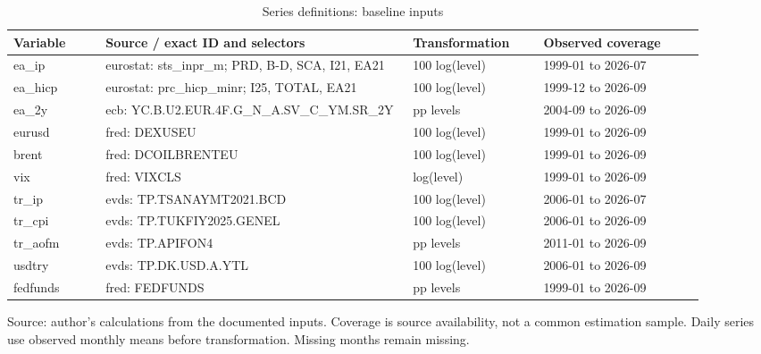 \begin{table}[htbp]
\centering
\footnotesize
\caption{Series definitions: baseline inputs}
\begin{tabularx}{\linewidth}{p{0.12\linewidth}p{0.40\linewidth}p{0.17\linewidth}p{0.21\linewidth}}
\toprule
Variable & Source / exact ID and selectors & Transformation & Observed coverage \\
\midrule
ea\_\allowbreak{}ip & eurostat: sts\_\allowbreak{}inpr\_\allowbreak{}m; PRD, B-D, SCA, I21, EA21 & 100 log(level) & 1999-01 to 2026-07 \\
ea\_\allowbreak{}hicp & eurostat: prc\_\allowbreak{}hicp\_\allowbreak{}minr; I25, TOTAL, EA21 & 100 log(level) & 1999-12 to 2026-09 \\
ea\_\allowbreak{}2y & ecb: YC.\allowbreak{}B.\allowbreak{}U2.\allowbreak{}EUR.\allowbreak{}4F.\allowbreak{}G\_\allowbreak{}N\_\allowbreak{}A.\allowbreak{}SV\_\allowbreak{}C\_\allowbreak{}YM.\allowbreak{}SR\_\allowbreak{}2Y & pp levels & 2004-09 to 2026-09 \\
eurusd & fred: DEXUSEU & 100 log(level) & 1999-01 to 2026-09 \\
brent & fred: DCOILBRENTEU & 100 log(level) & 1999-01 to 2026-09 \\
vix & fred: VIXCLS & log(level) & 1999-01 to 2026-09 \\
tr\_\allowbreak{}ip & evds: TP.TSANAYMT2021.BCD & 100 log(level) & 2006-01 to 2026-07 \\
tr\_\allowbreak{}cpi & evds: TP.TUKFIY2025.GENEL & 100 log(level) & 2006-01 to 2026-09 \\
tr\_\allowbreak{}aofm & evds: TP.APIFON4 & pp levels & 2011-01 to 2026-09 \\
usdtry & evds: TP.DK.USD.A.YTL & 100 log(level) & 2006-01 to 2026-09 \\
fedfunds & fred: FEDFUNDS & pp levels & 1999-01 to 2026-09 \\
\bottomrule
\end{tabularx}
\par\vspace{3pt}\begin{minipage}{\linewidth}\footnotesize Source: author's calculations from the documented inputs.\allowbreak{} Coverage is source availability, not a common estimation sample.\allowbreak{} Daily series use observed monthly means before transformation.\allowbreak{} Missing months remain missing.\allowbreak{}\end{minipage}
\end{table}
